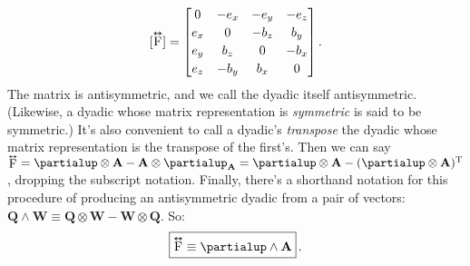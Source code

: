 \documentclass[12pt]{article}
\renewcommand{\vv}[1]{\mathbf{#1}}
\newcommand{\tightoverset}[2]{%
  \mathop{#2}\limits^{\vbox to -.5ex{\kern-0.75ex\hbox{$#1$}\vss}}}
\newcommand{\inlinedy}[1]{\tightoverset{\text{\tiny$\bm\leftrightarrow$}}{#1}}
\newcommand{\capdy}[1]{ \overset{ \text{\tiny$\bm\leftrightarrow$} }{\vphantom{\text{\small{A}}}\smash{#1}} }
\begin{document}
\begin{equation}\label{eq:emt}
[\capdy{\mathrm{F}}]
=
\begin{bmatrix}
0 & -e_x & -e_y & -e_z \\[.5ex]
e_x & 0 & -b_z & b_y \\[.5ex]
e_y & b_z & 0 & -b_x \\[.5ex]
e_z & -b_y & b_x & 0
\end{bmatrix} .
\end{equation}
The matrix is antisymmetric, and we call the dyadic itself antisymmetric. (Likewise, a dyadic whose matrix representation is \emph{symmetric} is said to be symmetric.) It's also convenient to call a dyadic's \emph{transpose} the dyadic whose matrix representation is the transpose of the first's. Then we can say ${\inlinedy{\mathrm{F}} = \partialup \otimes \vv A - \vv A \otimes \partialup_{\vv A} = \partialup \otimes \vv A - (\partialup \otimes \vv A)^\mathrm{T}}$, dropping the subscript notation. Finally, there's a shorthand notation for this procedure of producing an antisymmetric dyadic from a pair of vectors: $\vv Q \wedge \vv W \equiv \vv Q \otimes \vv W - \vv W \otimes \vv Q$. So:
\begin{equation}\label{eq:emta}
\boxed{ \vphantom{A_{A_A}} \capdy{\mathrm{F}} \equiv \partialup \wedge \vv A } \, . 
\end{equation}
\end{document}
